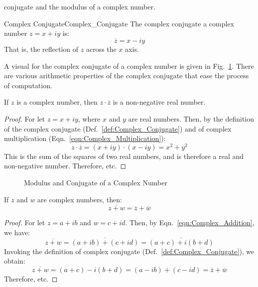     conjugate and the modulus of a complex number.
    \begin{ldefinition}{Complex Conjugate}{Complex_Conjugate}
        The \gls{complex conjugate} a complex number $z=x+iy$ is:
        \begin{equation}
            \overline{z}=x-iy
        \end{equation}
        That is, the reflection of $z$ across the $x$ axis.
    \end{ldefinition}
    A visual for the complex conjugate of a complex number is given in
    Fig.~\ref{fig:Conj_and_Mod_of_Com_Num}. There are various
    arithmetic properties of the complex conjugate that ease the
    process of computation.
    \begin{theorem}
        If $z$ is a complex number, then $z\cdot\overline{z}$ is
        a non-negative real number.
    \end{theorem}
    \begin{proof}
        For let $z=x+iy$, where $x$ and $y$ are real numbers. Then, by
        the definition of the complex conjugate
        (Def.~\ref{def:Complex_Conjugate}) and of
        complex multiplication (Eqn.~\ref{eqn:Complex_Multiplication}):
        \begin{equation}
            z\cdot\overline{z}=(x+iy)\cdot(x-iy)
                              =x^{2}+y^{2}
        \end{equation}
        This is the sum of the squares of two real numbers, and is
        therefore a real and non-negative number. Therefore, etc.
    \end{proof}
    \begin{figure}[H]
        \centering
        \captionsetup{type=figure}
        
        \caption{Modulus and Conjugate of a Complex Number}
        \label{fig:Conj_and_Mod_of_Com_Num}
    \end{figure}
    \begin{theorem}
        If $z$ and $w$ are complex numbers, then:
        \begin{equation}
            \overline{z+w}=\overline{z}+\overline{w}
        \end{equation}
    \end{theorem}
    \begin{proof}
        For let $z=a+ib$ and $w=c+id$. Then, by
        Eqn.~\ref{eqn:Complex_Addition}, we have:
        \begin{equation}
            \overline{z+w}=\overline{(a+ib)+(c+id)}
                          =\overline{(a+c)+i(b+d)}
        \end{equation}
        Invoking the definition of complex conjugate
        (Def.~\ref{def:Complex_Conjugate}), we obtain:
        \begin{equation}
            \overline{z+w}=(a+c)-i(b+d)
                          =(a-ib)+(c-id)
                          =\overline{z}+\overline{w}
        \end{equation}
        Therefore, etc.
    \end{proof}
